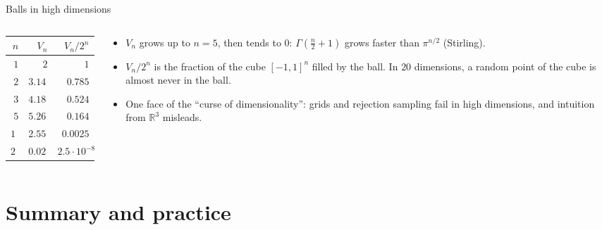 \documentclass[10pt]{wosm-slides}
\newcommand{\R}{\mathbb{R}}
\begin{document}
\begin{frame}{Balls in high dimensions}
  \begin{columns}[c]
    \begin{column}{0.45\textwidth}
      \centering
      \begin{tabular}{rrr}
        \toprule
        $n$ & $V_n$ & $V_n / 2^n$ \\
        \midrule
        $1$  & $2$      & $1$ \\
        $2$  & $3.1416$ & $0.785$ \\
        $3$  & $4.1888$ & $0.524$ \\
        $5$  & $5.2638$ & $0.164$ \\
        $10$ & $2.5502$ & $0.0025$ \\
        $20$ & $0.0258$ & $2.5 \cdot 10^{-8}$ \\
        \bottomrule
      \end{tabular}
    \end{column}
    \begin{column}{0.53\textwidth}
      \begin{itemize}
        \item $V_n$ grows up to $n = 5$, then tends to $0$: $\Gamma(\frac n2 + 1)$ grows faster than
          $\pi^{n/2}$ (Stirling).
        \pause
        \item $V_n / 2^n$ is the fraction of the cube $[-1, 1]^n$ filled by the ball. In $20$
          dimensions, a random point of the cube is almost never in the ball.
        \pause
        \item One face of the ``curse of dimensionality'': grids and rejection sampling fail in
          high dimensions, and intuition from $\R^3$ misleads.
      \end{itemize}
    \end{column}
  \end{columns}
\end{frame}

\section{Summary and practice}
\end{document}
